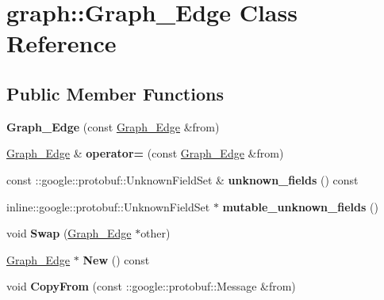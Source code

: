 \hypertarget{classgraph_1_1Graph__Edge}{
\section{graph::Graph\_\-Edge Class Reference}
\label{classgraph_1_1Graph__Edge}
}
\subsection*{Public Member Functions}
\begin{DoxyCompactItemize}
\item 
\hypertarget{classgraph_1_1Graph__Edge_a1b8cdd9aa0720a4b78149954fb109810}{
{\bfseries Graph\_\-Edge} (const \hyperlink{classgraph_1_1Graph__Edge}{Graph\_\-Edge} \&from)}
\label{classgraph_1_1Graph__Edge_a1b8cdd9aa0720a4b78149954fb109810}

\item 
\hypertarget{classgraph_1_1Graph__Edge_a271827f73c4c315e95210cccb000e8f1}{
\hyperlink{classgraph_1_1Graph__Edge}{Graph\_\-Edge} \& {\bfseries operator=} (const \hyperlink{classgraph_1_1Graph__Edge}{Graph\_\-Edge} \&from)}
\label{classgraph_1_1Graph__Edge_a271827f73c4c315e95210cccb000e8f1}

\item 
\hypertarget{classgraph_1_1Graph__Edge_ad3839379afb5e8a8965bbfa48e6ab52c}{
const ::google::protobuf::UnknownFieldSet \& {\bfseries unknown\_\-fields} () const }
\label{classgraph_1_1Graph__Edge_ad3839379afb5e8a8965bbfa48e6ab52c}

\item 
\hypertarget{classgraph_1_1Graph__Edge_ab23e809a21f594cc319a0d1f781fa384}{
inline::google::protobuf::UnknownFieldSet $\ast$ {\bfseries mutable\_\-unknown\_\-fields} ()}
\label{classgraph_1_1Graph__Edge_ab23e809a21f594cc319a0d1f781fa384}

\item 
\hypertarget{classgraph_1_1Graph__Edge_aaaf2710e8754faf829d2966551176aac}{
void {\bfseries Swap} (\hyperlink{classgraph_1_1Graph__Edge}{Graph\_\-Edge} $\ast$other)}
\label{classgraph_1_1Graph__Edge_aaaf2710e8754faf829d2966551176aac}

\item 
\hypertarget{classgraph_1_1Graph__Edge_a0758753878823f19c37d391d965a4fc3}{
\hyperlink{classgraph_1_1Graph__Edge}{Graph\_\-Edge} $\ast$ {\bfseries New} () const }
\label{classgraph_1_1Graph__Edge_a0758753878823f19c37d391d965a4fc3}

\item 
\hypertarget{classgraph_1_1Graph__Edge_ae610eaa471b68f5c8effe5bd28b5cf8c}{
void {\bfseries CopyFrom} (const ::google::protobuf::Message \&from)}
\label{classgraph_1_1Graph__Edge_ae610eaa471b68f5c8effe5bd28b5cf8c}


\end{DoxyCompactItemize}

